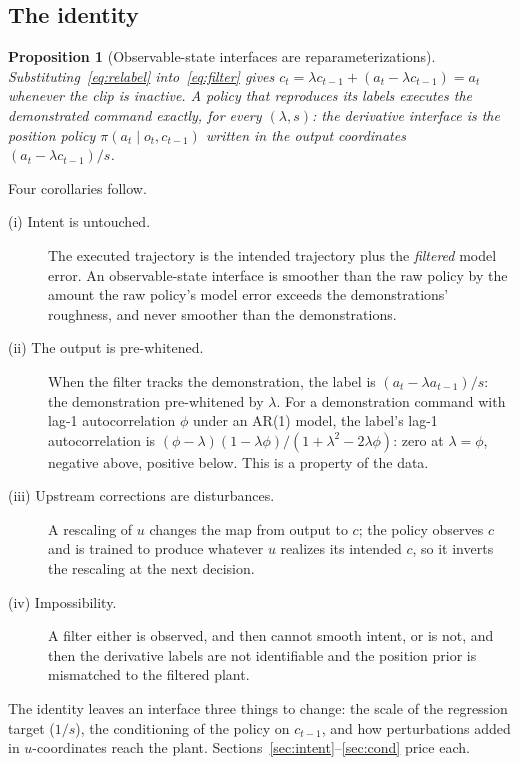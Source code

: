 \documentclass{article}
\newtheorem{proposition}{Proposition}
\begin{document}
\subsection{The identity}

\begin{proposition}[Observable-state interfaces are reparameterizations]
\label{prop:identity}
Substituting~\eqref{eq:relabel} into~\eqref{eq:filter} gives $c_t=\lambda c_{t-1}+(a_t-\lambda c_{t-1})=a_t$ whenever the clip is inactive. A policy that reproduces its labels executes the demonstrated command exactly, for every $(\lambda,s)$: the derivative interface is the position policy $\pi(a_t\mid o_t,c_{t-1})$ written in the output coordinates $(a_t-\lambda c_{t-1})/s$.
\end{proposition}

\noindent Four corollaries follow.
\begin{description}
\item[(i) Intent is untouched.] The executed trajectory is the intended trajectory plus the \emph{filtered} model error. An observable-state interface is smoother than the raw policy by the amount the raw policy's model error exceeds the demonstrations' roughness, and never smoother than the demonstrations.
\item[(ii) The output is pre-whitened.] When the filter tracks the demonstration, the label is $(a_t-\lambda a_{t-1})/s$: the demonstration pre-whitened by $\lambda$. For a demonstration command with lag-1 autocorrelation $\phi$ under an AR(1) model, the label's lag-1 autocorrelation is $(\phi-\lambda)(1-\lambda\phi)/(1+\lambda^2-2\lambda\phi)$: zero at $\lambda=\phi$, negative above, positive below. This is a property of the data.
\item[(iii) Upstream corrections are disturbances.] A rescaling of $u$ changes the map from output to $c$; the policy observes $c$ and is trained to produce whatever $u$ realizes its intended $c$, so it inverts the rescaling at the next decision.
\item[(iv) Impossibility.] A filter either is observed, and then cannot smooth intent, or is not, and then the derivative labels are not identifiable and the position prior is mismatched to the filtered plant.
\end{description}
The identity leaves an interface three things to change: the scale of the regression target ($1/s$), the conditioning of the policy on $c_{t-1}$, and how perturbations added in $u$-coordinates reach the plant. Sections~\ref{sec:intent}--\ref{sec:cond} price each.
\end{document}
